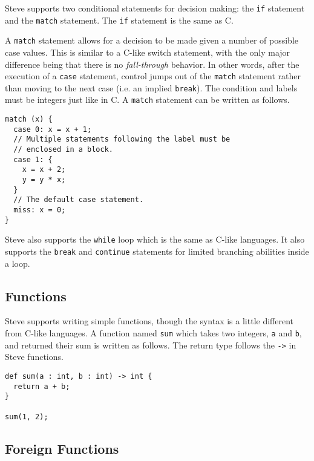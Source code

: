 Steve supports two conditional statements for decision making: the \texttt{if} statement and the \texttt{match} statement. 
The \texttt{if} statement is the same as C.

A \texttt{match} statement allows for a decision to be made given a number of 
possible case values. 
This is similar to a C-like switch statement, with the only
major difference being that there is no \textit{fall-through} behavior. In other
words, after the execution of a \texttt{case} statement, control jumps out of the 
\texttt{match} statement rather than moving to the next case (i.e. an implied 
\texttt{break}). 
The condition and labels must be integers just like in C. 
A \texttt{match} statement can be written as follows.

\begin{codepage}
\begin{lstlisting}
match (x) {
  case 0: x = x + 1;
  // Multiple statements following the label must be
  // enclosed in a block.
  case 1: {
    x = x + 2;
    y = y * x;
  }
  // The default case statement.
  miss: x = 0;
}
\end{lstlisting}
\end{codepage}

Steve also supports the \texttt{while} loop which is the same as C-like languages. 
It also supports the \texttt{break} and \texttt{continue} statements for limited
branching abilities inside a loop. 

\subsection{Functions} \label{tut:function}

Steve supports writing simple functions, though the syntax is a little different
from C-like languages.
A function named \texttt{sum} which takes two
integers, \texttt{a} and \texttt{b}, and returned their sum is written as follows.
The return type follows the \texttt{->} in Steve functions.

\begin{codepage}
\begin{lstlisting}
def sum(a : int, b : int) -> int {
  return a + b;
}

sum(1, 2);
\end{lstlisting}
\end{codepage}

\subsection{Foreign Functions} \label{tut:foreign}

